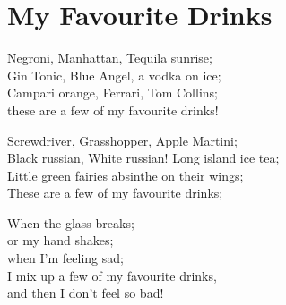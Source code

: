 \section{My Favourite Drinks}

Negroni, Manhattan, Tequila sunrise;\\
Gin Tonic, Blue Angel, a vodka on ice;\\
Campari orange, Ferrari, Tom Collins;\\
these are a few of my favourite drinks!

Screwdriver, Grasshopper, Apple Martini;\\
Black russian, White russian! Long island ice tea;\\
Little green fairies absinthe on their wings;\\
These are a few of my favourite drinks;

When the glass breaks;\\
or my hand shakes;\\
when I'm feeling sad;\\
I mix up a few of my favourite drinks,\\
and then I don't feel so bad!